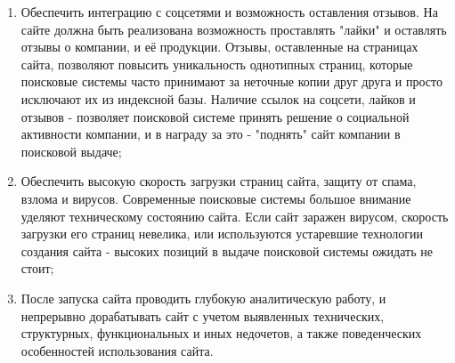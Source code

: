 \begin{enumerate}[label=\arabic*)]
    \item Обеспечить интеграцию с соцсетями и возможность оставления отзывов. На сайте должна быть реализована возможность проставлять "лайки" и оставлять отзывы о компании, и её продукции.
    Отзывы, оставленные на страницах сайта, позволяют повысить уникальность однотипных страниц, которые поисковые системы часто принимают за неточные копии друг друга и просто исключают их из индексной базы.
    Наличие ссылок на соцсети, лайков и отзывов - позволяет поисковой системе принять решение о социальной активности компании, и в награду за это - "поднять" сайт компании в поисковой выдаче;
    \item Обеспечить высокую скорость загрузки страниц сайта, защиту от спама, взлома и вирусов.
    Современные поисковые системы большое внимание уделяют техническому состоянию сайта.
     Если сайт заражен вирусом, скорость загрузки его страниц невелика, или используются устаревшие технологии создания сайта - высоких позиций в выдаче поисковой системы ожидать не стоит;
    \item После запуска сайта проводить глубокую аналитическую работу, и непрерывно дорабатывать сайт с учетом выявленных технических, структурных, функциональных и иных недочетов, а также поведенческих особенностей использования сайта.
  \end{enumerate}

